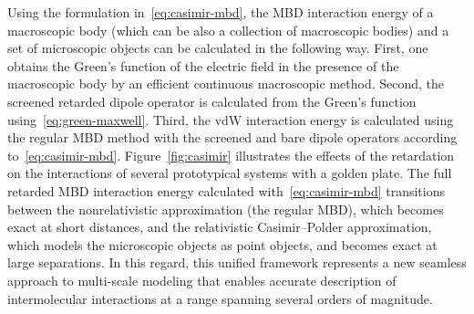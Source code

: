 Using the formulation in~\eqref{eq:casimir-mbd}, the MBD interaction energy of a macroscopic body (which can be also a collection of macroscopic bodies) and a set of microscopic objects can be calculated in the following way.
First, one obtains the Green's function of the electric field in the presence of the macroscopic body by an efficient continuous macroscopic method.
Second, the screened retarded dipole operator is calculated from the Green's function using~\eqref{eq:green-maxwell}.
Third, the vdW interaction energy is calculated using the regular MBD method with the screened and bare dipole operators according to~\eqref{eq:casimir-mbd}.
Figure~\ref{fig:casimir} illustrates the effects of the retardation on the interactions of several prototypical systems with a golden plate.
The full retarded MBD interaction energy calculated with~\ref{eq:casimir-mbd} transitions between the nonrelativistic approximation (the regular MBD), which becomes exact at short distances, and the relativistic Casimir--Polder approximation, which models the microscopic objects as point objects, and becomes exact at large separations.
In this regard, this unified framework represents a new seamless approach to multi-scale modeling that enables accurate description of intermolecular interactions at a range spanning several orders of magnitude.
